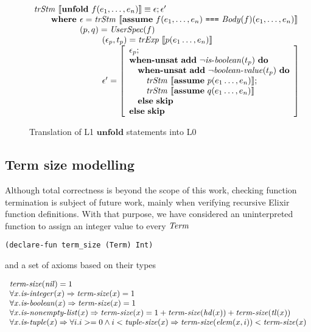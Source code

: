 \begin{figure}
\[
\begin{array}{l}
\trStm{\unfoldE~f(e_1, \dots, e_n)} \equiv \epsilon;\epsilon'\\
\qquad \textbf{where } \epsilon = \trStm{\assumeE~f(e_1, \dots, e_n)~\texttt{===}~\Body{f}(e_1, \dots, e_n)}\\
\qquad \phantom{\textbf{where }} (p, q) = \UserSpec{f}\\
\qquad\qquad\qquad\qquad (\epsilon_p, t_p) = \trExps{p(e_1\ldots,e_n)}\\
\qquad\qquad\qquad\qquad \epsilon' = \left[ 
\begin{array}{l}
\epsilon_p;\\
\whenUnsatW~\addE~\neg\isboolean{t_p}~\doW\\
\quad\whenUnsatW~\addE~\neg\booleanvalue{t_p}~\doW\\
\quad\quad\trStm{\assumeE~p(e_1\ldots,e_n)};\\
\quad\quad\trStm{\assumeE~q(e_1\ldots,e_n)}\\
\quad\elseW~\skipE\\
\elseW~\skipE
\end{array}
\right] \\
\end{array}
\]
\caption{Translation of L1 $\mathbf{unfold}$ statements into L0}
\label{fig:unfoldtr}
\end{figure}

\subsection{Term size modelling}
\label{sec:termsize}

Although total correctness is beyond the scope of this work, checking function
termination is subject of future work, mainly when verifying recursive Elixir
function definitions. With that purpose, we have considered an uninterpreted
function to assign an integer value to every $\mathit{Term}$

\begin{verbatim}
(declare-fun term_size (Term) Int)
\end{verbatim}

and a set of axioms based on their types

\[
\begin{array}{l}
\mathit{term\mbox{-}size}(\mathit{nil}) = 1\\
\forall x. \mathit{is\mbox{-}integer}(x) \Rightarrow \mathit{term\mbox{-}size}(x) = 1\\
\forall x. \mathit{is\mbox{-}boolean}(x) \Rightarrow \mathit{term\mbox{-}size}(x) = 1\\
\forall x. \mathit{is\mbox{-}nonempty\mbox{-}list}(x) \Rightarrow \mathit{term\mbox{-}size}(x) = 1 + \mathit{term\mbox{-}size}(\mathit{hd}(x)) + \mathit{term\mbox{-}size}(\mathit{tl}(x))\\
\forall x. \mathit{is\mbox{-}tuple}(x) \Rightarrow \forall i. i >= 0 \wedge i < \mathit{tuple\mbox{-}size}(x) \Rightarrow \mathit{term\mbox{-}size}(\mathit{elem}(x, i)) < \mathit{term\mbox{-}size}(x)\\
\end{array}
\]


